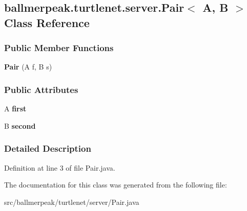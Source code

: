 \hypertarget{classballmerpeak_1_1turtlenet_1_1server_1_1Pair_3_01A_00_01B_01_4}{\subsection{ballmerpeak.\-turtlenet.\-server.\-Pair$<$ A, B $>$ Class Reference}
\label{classballmerpeak_1_1turtlenet_1_1server_1_1Pair_3_01A_00_01B_01_4}
}
\subsubsection*{Public Member Functions}
\begin{DoxyCompactItemize}
\item 
\hypertarget{classballmerpeak_1_1turtlenet_1_1server_1_1Pair_3_01A_00_01B_01_4_aae84441494cd93e16406b3999226d559}{{\bfseries Pair} (A f, B s)}\label{classballmerpeak_1_1turtlenet_1_1server_1_1Pair_3_01A_00_01B_01_4_aae84441494cd93e16406b3999226d559}

\end{DoxyCompactItemize}
\subsubsection*{Public Attributes}
\begin{DoxyCompactItemize}
\item 
\hypertarget{classballmerpeak_1_1turtlenet_1_1server_1_1Pair_3_01A_00_01B_01_4_a4e253f84c02d872c0a10e5f07af419ea}{A {\bfseries first}}\label{classballmerpeak_1_1turtlenet_1_1server_1_1Pair_3_01A_00_01B_01_4_a4e253f84c02d872c0a10e5f07af419ea}

\item 
\hypertarget{classballmerpeak_1_1turtlenet_1_1server_1_1Pair_3_01A_00_01B_01_4_ac5d0c46e2e78cb5aa67fe6e3d1ee2add}{B {\bfseries second}}\label{classballmerpeak_1_1turtlenet_1_1server_1_1Pair_3_01A_00_01B_01_4_ac5d0c46e2e78cb5aa67fe6e3d1ee2add}

\end{DoxyCompactItemize}


\subsubsection{Detailed Description}


Definition at line 3 of file Pair.\-java.



The documentation for this class was generated from the following file\-:\begin{DoxyCompactItemize}
\item 
src/ballmerpeak/turtlenet/server/Pair.\-java\end{DoxyCompactItemize}
